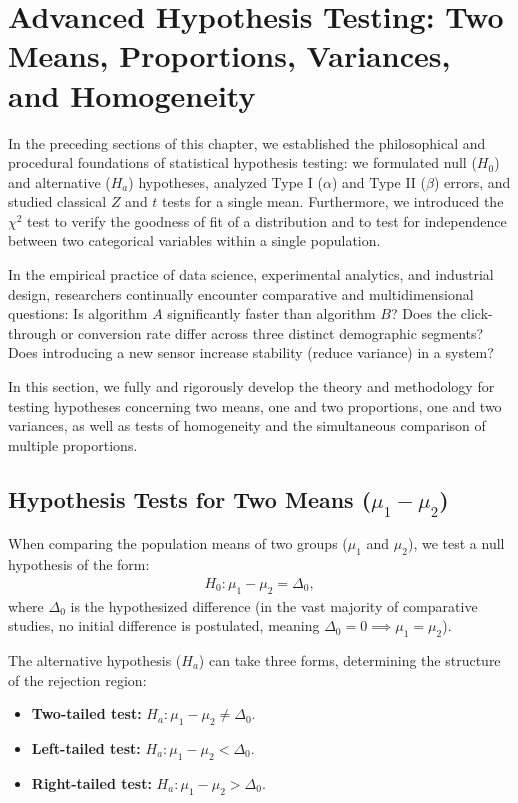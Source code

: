 \section{Advanced Hypothesis Testing: Two Means, Proportions, Variances, and Homogeneity}

In the preceding sections of this chapter, we established the philosophical and procedural foundations of statistical hypothesis testing: we formulated null ($H_0$) and alternative ($H_a$) hypotheses, analyzed Type I ($\alpha$) and Type II ($\beta$) errors, and studied classical $Z$ and $t$ tests for a single mean. Furthermore, we introduced the $\chi^2$ test to verify the goodness of fit of a distribution and to test for independence between two categorical variables within a single population.

In the empirical practice of data science, experimental analytics, and industrial design, researchers continually encounter comparative and multidimensional questions: Is algorithm $A$ significantly faster than algorithm $B$? Does the click-through or conversion rate differ across three distinct demographic segments? Does introducing a new sensor increase stability (reduce variance) in a system?

In this section, we fully and rigorously develop the theory and methodology for testing hypotheses concerning two means, one and two proportions, one and two variances, as well as tests of homogeneity and the simultaneous comparison of multiple proportions.

\subsection{Hypothesis Tests for Two Means ($\mu_1 - \mu_2$)}

When comparing the population means of two groups ($\mu_1$ and $\mu_2$), we test a null hypothesis of the form:
\begin{align}
	H_0: \mu_1 - \mu_2 = \Delta_0,
\end{align}
where $\Delta_0$ is the hypothesized difference (in the vast majority of comparative studies, no initial difference is postulated, meaning $\Delta_0 = 0 \implies \mu_1 = \mu_2$).

The alternative hypothesis ($H_a$) can take three forms, determining the structure of the rejection region:
\begin{itemize}
	\item \textbf{Two-tailed test:} $H_a: \mu_1 - \mu_2 \neq \Delta_0$.
	\item \textbf{Left-tailed test:} $H_a: \mu_1 - \mu_2 < \Delta_0$.
	\item \textbf{Right-tailed test:} $H_a: \mu_1 - \mu_2 > \Delta_0$.
\end{itemize}


